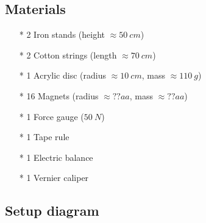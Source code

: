 \documentclass[a4paper]{article}
\begin{document}
\subsection{Materials}

\begin{itemize}
    \item[*] 2 Iron stands (height $\approx \SI{50}{cm}$)
    \item[*] 2 Cotton strings (length $\approx \SI{70}{cm}$)
    \item[*] 1 Acrylic disc (radius $\approx \SI{10}{cm}$, mass $\approx \SI{110}{g}$)
    \item[*] 16 Magnets (radius $\approx ??aa$, mass $\approx ??aa$)
    \item[*] 1 Force gauge ($\SI{50}{N}$)
    \item[*] 1 Tape rule
    \item[*] 1 Electric balance
    \item[*] 1 Vernier caliper  
\end{itemize}

\subsection{Setup diagram}
\end{document}
